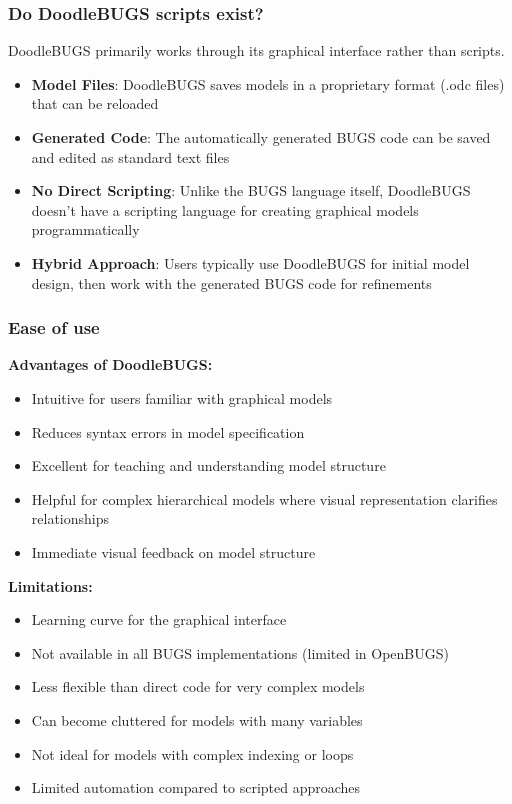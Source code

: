 \subsubsection*{Do DoodleBUGS scripts exist?}

DoodleBUGS primarily works through its graphical interface rather than scripts.
\begin{itemize}
    \item \textbf{Model Files}: DoodleBUGS saves models in a proprietary format (.odc files) that can be reloaded
    \item \textbf{Generated Code}: The automatically generated BUGS code can be saved and edited as standard text files
    \item \textbf{No Direct Scripting}: Unlike the BUGS language itself, DoodleBUGS doesn't have a scripting language for creating graphical models programmatically
    \item \textbf{Hybrid Approach}: Users typically use DoodleBUGS for initial model design, then work with the generated BUGS code for refinements
\end{itemize}

\subsubsection*{Ease of use}

\textbf{Advantages of DoodleBUGS:}
\begin{itemize}
    \item Intuitive for users familiar with graphical models
    \item Reduces syntax errors in model specification
    \item Excellent for teaching and understanding model structure
    \item Helpful for complex hierarchical models where visual representation clarifies relationships
    \item Immediate visual feedback on model structure
\end{itemize}

\textbf{Limitations:}
\begin{itemize}
    \item Learning curve for the graphical interface
    \item Not available in all BUGS implementations (limited in OpenBUGS)
    \item Less flexible than direct code for very complex models
    \item Can become cluttered for models with many variables
    \item Not ideal for models with complex indexing or loops
    \item Limited automation compared to scripted approaches
\end{itemize}

